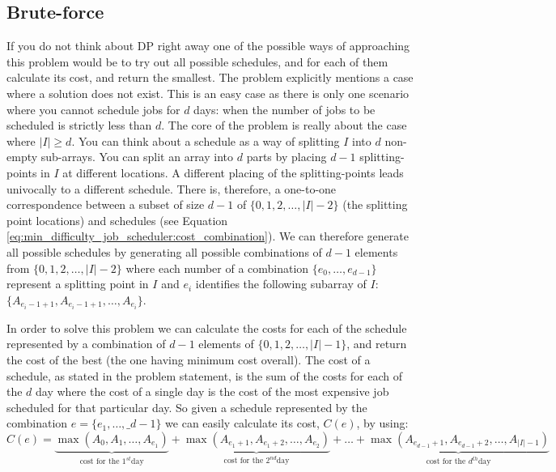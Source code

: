 \subsection{Brute-force}
\label{min_difficulty_job_scheduler:sec:bruteforce}
If you do not think about DP right away one of the possible ways of approaching this problem would
be to try out all possible schedules, and for each of them calculate its cost, and return the
smallest. The problem explicitly mentions a case where a solution does not exist. This is an easy
case as there is only one scenario where you cannot schedule jobs for $d$ days: when the number of
jobs to be scheduled is strictly less than $d$. The core of the problem is really about the case
where $|I| \geq d$. You can think about a schedule as a way of splitting $I$ into $d$ non-empty
sub-arrays. You can split an array into $d$ parts by placing $d-1$ splitting-points in $I$ at
different locations. A different placing of the splitting-points leads univocally to a different
schedule. There is, therefore, a one-to-one correspondence between a subset of size $d-1$ of
$\{0,1,2, \ldots, |I|-2\}$ (the splitting point locations) and schedules (see Equation
\ref{eq:min_difficulty_job_scheduler:cost_combination}). We can therefore generate all possible
schedules by generating all possible combinations of $d-1$ elements from $\{0,1,2, \ldots, |I|-2\}$
where each number of a combination  $\{e_0, \ldots, e_{d-1}\}$ represent a splitting point in $I$
and $e_i$ identifies the following subarray of $I$: $\{A_{e_i-1+1}, A_{e_i-1+1}, \ldots ,
A_{e_i}\}$.

In order to solve this problem we can calculate the costs for each of the schedule represented by a
combination of $d-1$ elements of $\{0,1,2, \ldots, |I|-1\}$, and return the cost of the best (the
one having minimum cost overall). The cost of a schedule, as stated in the problem statement, is the
sum of the costs for each of the $d$ day where the cost of a single day is the cost of the most
expensive job scheduled for that particular day. So given a schedule represented by the combination
$e = \{e_1, \ldots, \_{d-1}\}$ we can easily calculate its cost, $C(e)$, by using:
\begin{equation}
    C(e) = \underbrace{\max(A_0, A_1, \ldots, A_{e_1})}_{\text{cost for the } 1^{st} \text{day}} + \underbrace{\max(A_{e_1+1}, A_{e_1+2}, \ldots, A_{e_2})}_{\text{cost for the } 2^{nd} \text{day}} + \ldots + \underbrace{\max(A_{e_{d-1}+1}, A_{e_{d-1}+2}, \ldots, A_{|I|-1})}_{\text{cost for the } d^{th} \text{day}}
    \label{eq:min_difficulty_job_scheduler:cost_combination}
\end{equation}

